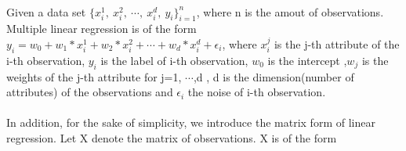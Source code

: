 \documentclass[11pt]{article}
\begin{document}
\\
Given a data set $\{x_i^1,\ x_i^2,\ \cdots,\ x_i^d,\ y_i\}_{i=1}^n$, where n is the amout of observations. Multiple linear regression is of the form $y_i = w_0 + w_1 * x_i^1 + w_2 * x_i^2 + \cdots + w_d * x_i^d + \epsilon_i$, where $x_i^j$ is the j-th attribute of the i-th observation, $y_i$ is the label of i-th observation, $w_0$ is the intercept ,$w_j$ is the weights of the j-th attribute for j=1, $\cdots$,d , d is the dimension(number of attributes) of the observations and $\epsilon_i$ the noise of i-th observation.\\
\\
In addition, for the sake of simplicity, we introduce the matrix form of linear regression. Let X denote the matrix of observations. X is of the form 
\end{document}
